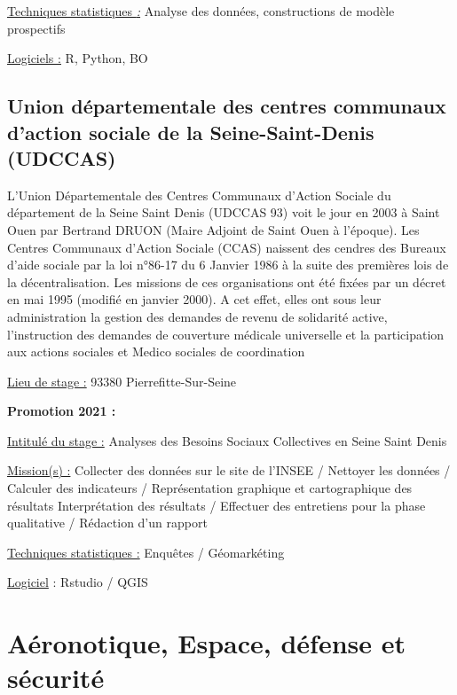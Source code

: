 \documentclass[
  letterpaper,
  DIV=11,
  numbers=noendperiod]{scrreprt}
\begin{document}
\uline{Techniques statistiques \emph{:}} Analyse des données,
constructions de modèle prospectifs

\uline{Logiciels :} R, Python, BO

\hypertarget{union-duxe9partementale-des-centres-communaux-daction-sociale-de-la-seine-saint-denis-udccas}{%
\section{\texorpdfstring{\textbf{Union départementale des centres
communaux d'action sociale de la Seine-Saint-Denis
(UDCCAS)}}{Union départementale des centres communaux d'action sociale de la Seine-Saint-Denis (UDCCAS)}}\label{union-duxe9partementale-des-centres-communaux-daction-sociale-de-la-seine-saint-denis-udccas}}

L'Union Départementale des Centres Communaux d'Action Sociale du
département de la Seine Saint Denis (UDCCAS 93) voit le jour en 2003 à
Saint Ouen par Bertrand DRUON (Maire Adjoint de Saint Ouen à l'époque).
Les Centres Communaux d'Action Sociale (CCAS) naissent des cendres des
Bureaux d'aide sociale par la loi n°86-17 du 6 Janvier 1986 à la suite
des premières lois de la décentralisation. Les missions de ces
organisations ont été fixées par un décret en mai 1995 (modifié en
janvier 2000). A cet effet, elles ont sous leur administration la
gestion des demandes de revenu de solidarité active, l'instruction des
demandes de couverture médicale universelle et la participation aux
actions sociales et Medico sociales de coordination

\uline{Lieu de stage :} 93380 Pierrefitte-Sur-Seine

\textbf{Promotion 2021 :}

\uline{Intitulé du stage :} Analyses des Besoins Sociaux Collectives en
Seine Saint Denis

\uline{Mission(s) :} Collecter des données sur le site de l'INSEE /
Nettoyer les données / Calculer des indicateurs / Représentation
graphique et cartographique des résultats Interprétation des résultats /
Effectuer des entretiens pour la phase qualitative / Rédaction d'un
rapport

\uline{Techniques statistiques :} Enquêtes / Géomarkéting

\uline{Logiciel} : Rstudio / QGIS


\hypertarget{auxe9ronotique-espace-duxe9fense-et-suxe9curituxe9}{%
\chapter{Aéronotique, Espace, défense et
sécurité}\label{auxe9ronotique-espace-duxe9fense-et-suxe9curituxe9}}
\end{document}
